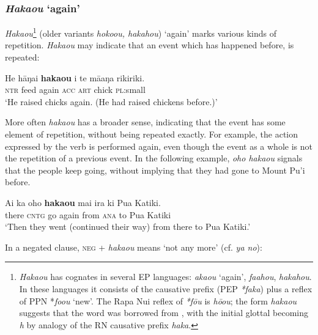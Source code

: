 \subsubsection{\textit{Haka{\ꞌ}ou} ‘again’}\label{sec:4.5.3.4}
\textit{Haka{\ꞌ}ou}\footnote{\label{fn:199}\textit{Haka{\ꞌ}ou} has cognates in several EP languages:  \textit{{\ꞌ}aka{\ꞌ}ou} ‘again’,  \textit{fa{\ꞌ}ahou},  \textit{hakahou}. In these languages it consists of the causative prefix (PEP \textit{*faka}) plus a reflex of PPN *\textit{fo{\ꞌ}ou} ‘new’. The Rapa Nui reflex of \textit{*fōu} is \textit{hō{\ꞌ}ou}; the form \textit{haka{\ꞌ}ou} suggests that the word was borrowed from , with the initial glottal becoming \textit{h} by analogy of the RN causative prefix \textit{haka}.} (older variants \textit{hoko{\ꞌ}ou, hakahou}) ‘again’ marks various kinds of repetition. \textit{Haka{\ꞌ}ou} may indicate that an event which has happened before, is repeated:

\ea\label{ex:4.141}
\gll He hāŋai \textbf{haka{\ꞌ}ou} i te mā{\ꞌ}aŋa rikiriki. \\
\textsc{ntr} feed again \textsc{acc} \textsc{art} chick \textsc{pl}:small \\

\glt
‘He raised chicks again. (He had raised chickens before.)’ \textstyleExampleref{[Mtx-7-05.021]}
\z

More often \textit{haka{\ꞌ}ou} has a broader sense, indicating that the event has some element of repetition, without being repeated exactly. For example, the action expressed by the verb is performed again, even though the event as a whole is not the repetition of a previous event. In the following example, \textit{oho haka{\ꞌ}ou} signals that the people keep going, without implying that they had gone to Mount Pu’i before.

\ea\label{ex:4.142}
\gll {\ꞌ}Ai ka oho \textbf{haka{\ꞌ}ou} mai ira ki Pua Katiki. \\
there \textsc{cntg} go again from \textsc{ana} to Pua Katiki \\

\glt
‘Then they went (continued their way) from there to Pua Katiki.’ \textstyleExampleref{[R420.047]} 
\z

In a negated clause, \textsc{neg} + \textit{haka{\ꞌ}ou} means ‘not any more’ (cf.  \textit{ya no}):

